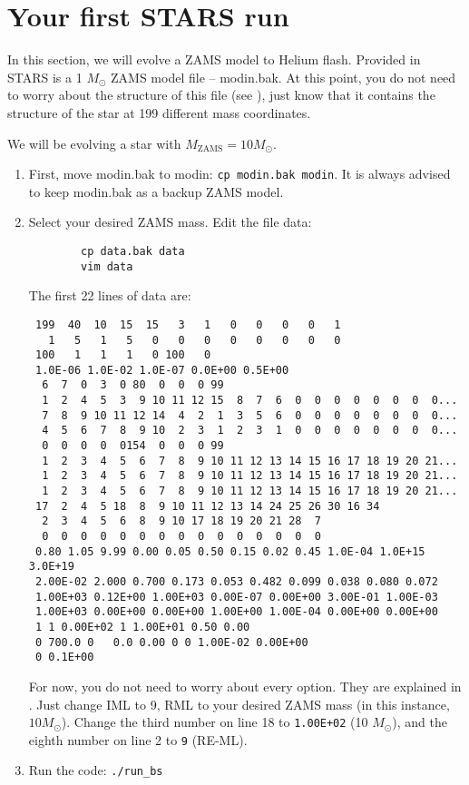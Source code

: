 \section{Your first STARS run}\label{sec:firststeps}

In this section, we will evolve a ZAMS model to Helium flash. Provided in STARS is a 1 $M_\odot$ ZAMS model file -- modin.bak. At this point, you do not need to worry about the structure of this file (see ), just know that it contains the structure of the star at 199 different mass coordinates.

We will be evolving a star with $M_\text{ZAMS} = 10 M_\odot$.

\begin{enumerate}
    \item First, move modin.bak to modin: \texttt{cp modin.bak modin}. It is always advised to keep modin.bak as a backup ZAMS model.
    
    \item Select your desired ZAMS mass. Edit the file data:
    
    \begin{verbatim}
        cp data.bak data
        vim data
    \end{verbatim}
    
    The first 22 lines of data are:
    
    \begin{verbatim}
 199  40  10  15  15   3   1   0   0   0   0   1
   1   5   1   5   0   0   0   0   0   0   0   0
 100   1   1   1   0 100   0
 1.0E-06 1.0E-02 1.0E-07 0.0E+00 0.5E+00
  6  7  0  3  0 80  0  0  0 99
  1  2  4  5  3  9 10 11 12 15  8  7  6  0  0  0  0  0  0  0  0...
  7  8  9 10 11 12 14  4  2  1  3  5  6  0  0  0  0  0  0  0  0...
  4  5  6  7  8  9 10  2  3  1  2  3  1  0  0  0  0  0  0  0  0...
  0  0  0  0  0154  0  0  0 99
  1  2  3  4  5  6  7  8  9 10 11 12 13 14 15 16 17 18 19 20 21...
  1  2  3  4  5  6  7  8  9 10 11 12 13 14 15 16 17 18 19 20 21...
  1  2  3  4  5  6  7  8  9 10 11 12 13 14 15 16 17 18 19 20 21...
 17  2  4  5 18  8  9 10 11 12 13 14 24 25 26 30 16 34
  2  3  4  5  6  8  9 10 17 18 19 20 21 28  7
  0  0  0  0  0  0  0  0  0  0  0  0  0  0  0
 0.80 1.05 9.99 0.00 0.05 0.50 0.15 0.02 0.45 1.0E-04 1.0E+15 3.0E+19
 2.00E-02 2.000 0.700 0.173 0.053 0.482 0.099 0.038 0.080 0.072
 1.00E+03 0.12E+00 1.00E+03 0.00E-07 0.00E+00 3.00E-01 1.00E-03
 1.00E+03 0.00E+00 0.00E+00 1.00E+00 1.00E-04 0.00E+00 0.00E+00
 1 1 0.00E+02 1 1.00E+01 0.50 0.00
 0 700.0 0   0.0 0.00 0 0 1.00E-02 0.00E+00
 0 0.1E+00
    \end{verbatim}
    
    For now, you do not need to worry about every option. They are explained in . Just change IML to 9, RML to your desired ZAMS mass (in this instance, $10 M_\odot$). Change the third number on line 18 to \texttt{1.00E+02} (10 $M_\odot$), and the eighth number on line 2 to \texttt{9} (RE-ML).
    
    \item Run the code: \texttt{./run_bs}
\end{enumerate}